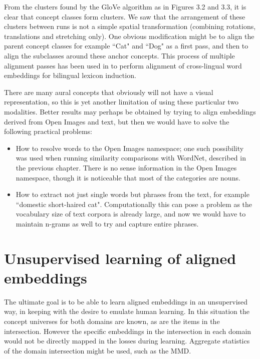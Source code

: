 From the clusters found by the GloVe algorithm as in Figures 3.2 and 3.3, it is clear that concept classes form clusters. We saw that the arrangement of these clusters between runs is not a simple spatial transformation (combining rotations, translations and stretching only). One obvious modification might be to align the parent concept classes for example ``Cat" and ``Dog" as a first pass, and then to align the subclasses around these anchor concepts. This process of multiple alignment passes has been used in \cite{UnsupervisedAlignmentWP} to perform alignment of cross-lingual word embeddings for bilingual lexicon induction. 

There are many aural concepts that obviously will not have a visual representation, so this is yet another limitation of using these particular two modalities. Better results may perhaps be obtained by trying to align embeddings derived from Open Images and text, but then we would have to solve the following practical problems:

\begin{itemize}
    \item How to resolve words to the Open Images namespace; one such possibility was used when running similarity comparisons with WordNet, described in the previous chapter. There is no sense information in the Open Images namespace, though it is noticeable that most of the categories are nouns.  
    \item How to extract not just single words but phrases from the text, for example ``domestic short-haired cat". Computationally this can pose a problem as the vocabulary size of text corpora is already large, and now we would have to maintain n-grams as well to try and capture entire phrases. 
\end{itemize}


\section{Unsupervised learning of aligned embeddings}

The ultimate goal is to be able to learn aligned embeddings in an unsupervised way, in keeping with the desire to emulate human learning. In this situation the concept universes for both domains are known, as are the items in the intersection. However the specific embeddings in the intersection in each domain would not be directly mapped in the losses during learning. Aggregate statistics of the domain intersection might be used, such as the MMD. 

